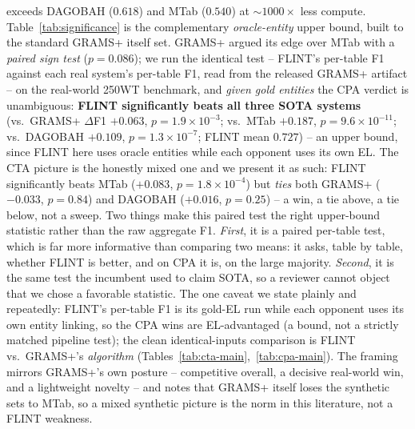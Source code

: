 exceeds DAGOBAH ($0.618$) and MTab ($0.540$) at $\sim$$1000\times$ less compute.
Table~\ref{tab:significance} is the complementary \emph{oracle-entity} upper bound, built
to the standard GRAMS+ itself set. GRAMS+ argued its edge over MTab with a
\emph{paired sign test} ($p{=}0.086$); we run the identical test -- FLINT's per-table F1
against each real system's per-table F1, read from the released GRAMS+ artifact -- on the
real-world 250WT benchmark, and \emph{given gold entities} the CPA verdict is
unambiguous: \textbf{FLINT significantly beats all three SOTA systems} (vs.\ GRAMS+
$\Delta$F1 $+0.063$, $p{=}1.9\times10^{-3}$; vs.\ MTab $+0.187$,
$p{=}9.6\times10^{-11}$; vs.\ DAGOBAH $+0.109$, $p{=}1.3\times10^{-7}$; FLINT mean
$0.727$) -- an upper bound, since FLINT here uses oracle entities while each opponent uses
its own EL. The CTA picture is the honestly
mixed one and we present it as such: FLINT significantly beats MTab ($+0.083$,
$p{=}1.8\times10^{-4}$) but \emph{ties} both GRAMS+ ($-0.033$, $p{=}0.84$) and DAGOBAH
($+0.016$, $p{=}0.25$) -- a win, a tie above, a tie below, not a sweep. Two things make
this paired test the right upper-bound statistic rather than the raw aggregate F1. \emph{First}, it is a paired
per-table test, which is far more informative than comparing two means: it asks, table by
table, whether FLINT is better, and on CPA it is, on the large majority. \emph{Second},
it is the same test the incumbent used to claim SOTA, so a reviewer cannot object that we
chose a favorable statistic. The one caveat we state plainly and repeatedly: FLINT's
per-table F1 is its gold-EL run while each opponent uses its own entity linking, so the
CPA wins are EL-advantaged (a bound, not a strictly matched pipeline test); the clean
identical-inputs comparison is FLINT vs.\ GRAMS+'s \emph{algorithm}
(Tables~\ref{tab:cta-main},~\ref{tab:cpa-main}). The framing mirrors GRAMS+'s own
posture -- competitive overall, a decisive real-world win, and a lightweight novelty --
and notes that GRAMS+ itself loses the synthetic sets to MTab, so a mixed synthetic
picture is the norm in this literature, not a FLINT weakness.

